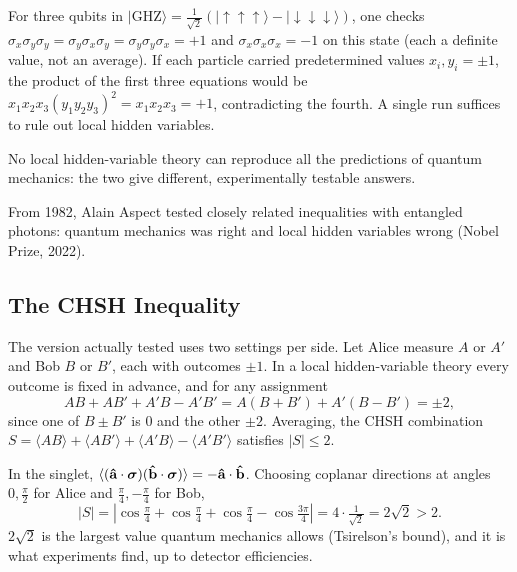 \begin{example}
For three qubits in $|\text{GHZ}\rangle = \frac{1}{\sqrt2}(|{\uparrow\uparrow\uparrow}\rangle - |{\downarrow\downarrow\downarrow}\rangle)$, one checks $\sigma_x\sigma_y\sigma_y = \sigma_y\sigma_x\sigma_y = \sigma_y\sigma_y\sigma_x = +1$ and $\sigma_x\sigma_x\sigma_x = -1$ on this state (each a definite value, not an average). If each particle carried predetermined values $x_i,y_i = \pm1$, the product of the first three equations would be $x_1x_2x_3(y_1y_2y_3)^2 = x_1x_2x_3 = +1$, contradicting the fourth. A single run suffices to rule out local hidden variables.
\end{example}

\begin{theorem}[Bell (1964)]
No local hidden-variable theory can reproduce all the predictions of quantum mechanics: the two give different, experimentally testable answers.
\end{theorem}

From 1982, Alain Aspect tested closely related inequalities with entangled photons: quantum mechanics was right and local hidden variables wrong (Nobel Prize, 2022).

\subsection{The CHSH Inequality}

The version actually tested uses two settings per side. Let Alice measure $A$ or $A'$ and Bob $B$ or $B'$, each with outcomes $\pm1$. In a local hidden-variable theory every outcome is fixed in advance, and for any assignment
\[
    AB + AB' + A'B - A'B' = A(B+B') + A'(B-B') = \pm2,
\]
since one of $B\pm B'$ is 0 and the other $\pm2$. Averaging, the CHSH combination $S = \langle AB\rangle + \langle AB'\rangle + \langle A'B\rangle - \langle A'B'\rangle$ satisfies $|S|\le2$.

In the singlet, $\langle(\boldsymbol{\hat{\textbf{a}}}\cdot\bm{\sigma})(\boldsymbol{\hat{\textbf{b}}}\cdot\bm{\sigma})\rangle = -\boldsymbol{\hat{\textbf{a}}}\cdot\boldsymbol{\hat{\textbf{b}}}$. Choosing coplanar directions at angles $0,\frac\pi2$ for Alice and $\frac\pi4,-\frac\pi4$ for Bob,
\[
    |S| = |\cos\tfrac\pi4 + \cos\tfrac\pi4 + \cos\tfrac\pi4 - \cos\tfrac{3\pi}{4}| = 4\cdot\tfrac{1}{\sqrt2} = 2\sqrt2>2 .
\]
$2\sqrt2$ is the largest value quantum mechanics allows (Tsirelson's bound), and it is what experiments find, up to detector efficiencies.

